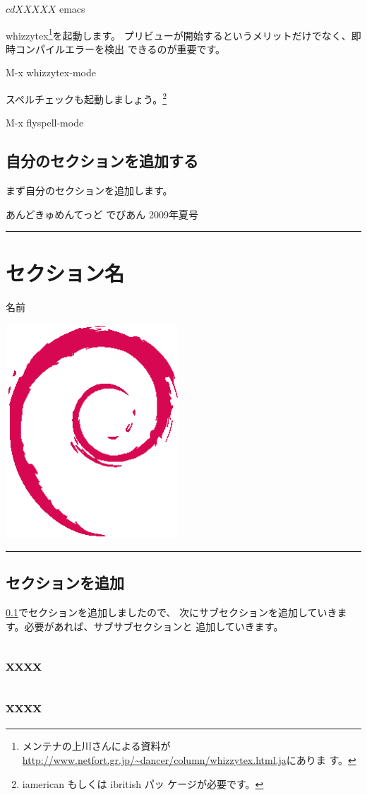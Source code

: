 \documentclass[mingoth,a4paper]{jsarticle}
\renewcommand{\dancersection}[2]{%
\newpage
あんどきゅめんてっど でびあん 2009年夏号
%
\vspace{0.1mm}\\
{\color{dancerlightblue}\rule{\hsize}{2mm}}

%
%
\begin{minipage}[t]{0.6\hsize}
\color{dancerdarkblue}
\vspace{1cm}
\section{#1}
\hfill{}#2\\
\end{minipage}
\begin{minipage}[t]{0.4\hsize}
\vspace{-2cm}
\hfill{}\includegraphics[height=8cm]{image200502/openlogo-nd.eps}\\
\vspace{-5cm}
\end{minipage}
%
%
{\color{dancerdarkblue}\rule{0.74\hsize}{2mm}}
%
\vspace{2cm}
}
\begin{document}
\begin{commandline}
\begin{commandline}
$ cd XXXXX
$ emacs 
\end{commandline}

whizzytex\footnote{メンテナの上川さんによる資料が
\url{http://www.netfort.gr.jp/~dancer/column/whizzytex.html.ja}にありま
す。}を起動します。
プリビューが開始するというメリットだけでなく、即時コンパイルエラーを検出
できるのが重要です。

\begin{commandline}
M-x whizzytex-mode 
\end{commandline}

スペルチェックも起動しましょう。\footnote{iamerican もしくは ibritish パッ
ケージが必要です。}

\begin{commandline}
M-x flyspell-mode
\end{commandline}

\subsection{自分のセクションを追加する}
\label{sec:adddancersection}

まず自分のセクションを追加します。

\begin{commandline}
 \dancersection{セクション名}{名前}
 \label{XXXX@YYYY}


\end{commandline}

\newpage

\subsection{セクションを追加}

\ref{sec:adddancersection}でセクションを追加しましたので、
次にサブセクションを追加していきます。必要があれば、サブサブセクションと
追加していきます。

\begin{commandline}

\subsection{xxxx} %

\subsection{xxxx}


\end{commandline}
\end{commandline}
\end{document}
